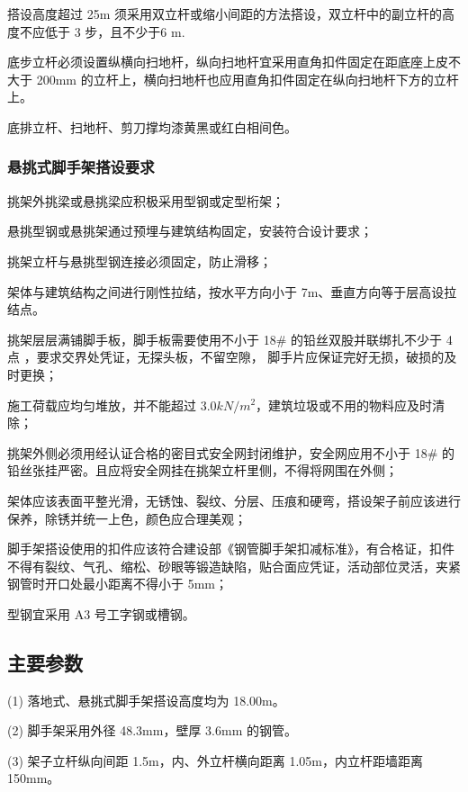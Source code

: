  搭设高度超过 25m 须采用双立杆或缩小间距的方法搭设，双立杆中的副立杆的高度不应低于 3 步，且不少于6 m.

 底步立杆必须设置纵横向扫地杆，纵向扫地杆宜采用直角扣件固定在距底座上皮不大于 200mm 的立杆上，横向扫地杆也应用直角扣件固定在纵向扫地杆下方的立杆上。

 底排立杆、扫地杆、剪刀撑均漆黄黑或红白相间色。\\

\subsubsection{悬挑式脚手架搭设要求}

 挑架外挑梁或悬挑梁应积极采用型钢或定型桁架；

 悬挑型钢或悬挑架通过预埋与建筑结构固定，安装符合设计要求；

 挑架立杆与悬挑型钢连接必须固定，防止滑移；

 架体与建筑结构之间进行刚性拉结，按水平方向小于 7m、垂直方向等于层高设拉结点。

 挑架层层满铺脚手板，脚手板需要使用不小于 18\# 的铅丝双股并联绑扎不少于 4 点 ，要求交界处凭证，无探头板，不留空隙，
脚手片应保证完好无损，破损的及时更换；

 施工荷载应均匀堆放，并不能超过 $3.0kN/m^2$，建筑垃圾或不用的物料应及时清除；

 挑架外侧必须用经认证合格的密目式安全网封闭维护，安全网应用不小于 18\# 的铅丝张挂严密。且应将安全网挂在挑架立杆里侧，不得将网围在外侧；

 架体应该表面平整光滑，无锈蚀、裂纹、分层、压痕和硬弯，搭设架子前应该进行保养，除锈并统一上色，颜色应合理美观；

 脚手架搭设使用的扣件应该符合建设部《钢管脚手架扣减标准》，有合格证，扣件不得有裂纹、气孔、缩松、砂眼等锻造缺陷，贴合面应凭证，活动部位灵活，夹紧钢管时开口处最小距离不得小于 5mm；

 型钢宜采用 A3 号工字钢或槽钢。

\subsection{主要参数}

(1) 落地式、悬挑式脚手架搭设高度均为 18.00m。

(2) 脚手架采用外径 48.3mm，壁厚 3.6mm 的钢管。

(3) 架子立杆纵向间距 1.5m，内、外立杆横向距离 1.05m，内立杆距墙距离 150mm。

